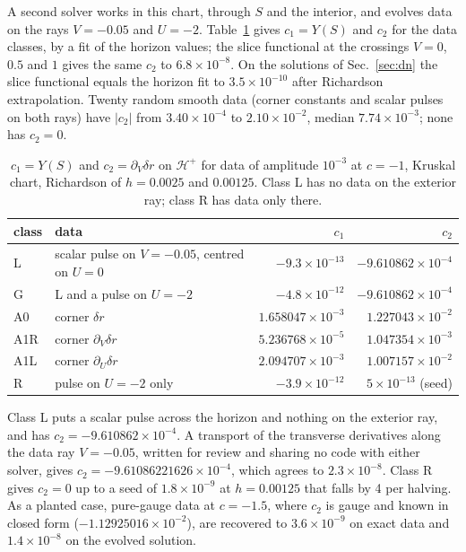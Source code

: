 \documentclass[11pt]{article}
\theoremstyle{plain}
\newcommand{\Hp}{\mathcal H^+}
\begin{document}
A second solver works in this chart, through $S$ and the interior, and evolves data on the rays $V=-0.05$ and $U=-2$.
Table~\ref{tab:c2} gives $c_1=Y(S)$ and $c_2$ for the data classes, by a fit of the horizon values; the slice functional at
the crossings $V=0$, $0.5$ and $1$ gives the same $c_2$ to $6.8\times10^{-8}$. On the solutions of Sec.~\ref{sec:dn} the slice
functional equals the horizon fit to $3.5\times10^{-10}$ after Richardson extrapolation. Twenty random smooth data (corner
constants and scalar pulses on both rays) have $|c_2|$ from $3.40\times10^{-4}$ to $2.10\times10^{-2}$, median
$7.74\times10^{-3}$; none has $c_2=0$.
\nopagebreak
\begin{table}[H]
\centering
\caption{$c_1=Y(S)$ and $c_2=\partial_V\delta r$ on $\Hp$ for data of amplitude $10^{-3}$ at $c=-1$, Kruskal chart,
Richardson of $h=0.0025$ and $0.00125$. Class L has no data on the exterior ray; class R has data only there.}
\label{tab:c2}
\begin{tabular}{llrr}
\toprule
class & data & $c_1$ & $c_2$ \\
\midrule
L & scalar pulse on $V=-0.05$, centred on $U=0$ & $-9.3\times10^{-13}$ & $-9.610862\times10^{-4}$ \\
G & L and a pulse on $U=-2$ & $-4.8\times10^{-12}$ & $-9.610862\times10^{-4}$ \\
A0 & corner $\delta r$ & $1.658047\times10^{-3}$ & $1.227043\times10^{-2}$ \\
A1R & corner $\partial_V\delta r$ & $5.236768\times10^{-5}$ & $1.047354\times10^{-3}$ \\
A1L & corner $\partial_U\delta r$ & $2.094707\times10^{-3}$ & $1.007157\times10^{-2}$ \\
R & pulse on $U=-2$ only & $-3.9\times10^{-12}$ & $5\times10^{-13}$ (seed) \\
\bottomrule
\end{tabular}
\end{table}

Class L puts a scalar pulse across the horizon and nothing on the exterior ray, and has $c_2=-9.610862\times10^{-4}$. A
transport of the transverse derivatives along the data ray $V=-0.05$, written for review and sharing no code with either
solver, gives $c_2=-9.61086221626\times10^{-4}$, which agrees to $2.3\times10^{-8}$. Class R gives $c_2=0$ up to a seed of
$1.8\times10^{-9}$ at $h=0.00125$ that falls by 4 per halving. As a planted case, pure-gauge data at $c=-1.5$, where $c_2$ is
gauge and known in closed form ($-1.12925016\times10^{-2}$), are recovered to $3.6\times10^{-9}$ on exact data and
$1.4\times10^{-8}$ on the evolved solution.
\end{document}
